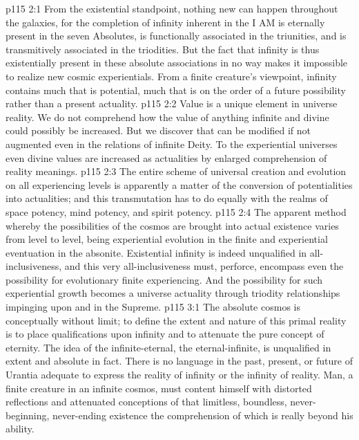 \vs p115 2:1 From the existential standpoint, nothing new can happen throughout the galaxies, for the completion of infinity inherent in the I AM is eternally present in the seven Absolutes, is functionally associated in the triunities, and is transmitively associated in the triodities. But the fact that infinity is thus existentially present in these absolute associations in no way makes it impossible to realize new cosmic experientials. From a finite creature’s viewpoint, infinity contains much that is potential, much that is on the order of a future possibility rather than a present actuality.
\vs p115 2:2 Value is a unique element in universe reality. We do not comprehend how the value of anything infinite and divine could possibly be increased. But we discover that  can be modified if not augmented even in the relations of infinite Deity. To the experiential universes even divine values are increased as actualities by enlarged comprehension of reality meanings.
\vs p115 2:3 The entire scheme of universal creation and evolution on all experiencing levels is apparently a matter of the conversion of potentialities into actualities; and this transmutation has to do equally with the realms of space potency, mind potency, and spirit potency.
\vs p115 2:4 The apparent method whereby the possibilities of the cosmos are brought into actual existence varies from level to level, being experiential evolution in the finite and experiential eventuation in the absonite. Existential infinity is indeed unqualified in all\hyp{}inclusiveness, and this very all\hyp{}inclusiveness must, perforce, encompass even the possibility for evolutionary finite experiencing. And the possibility for such experiential growth becomes a universe actuality through triodity relationships impinging upon and in the Supreme.
\vs p115 3:1 The absolute cosmos is conceptually without limit; to define the extent and nature of this primal reality is to place qualifications upon infinity and to attenuate the pure concept of eternity. The idea of the infinite\hyp{}eternal, the eternal\hyp{}infinite, is unqualified in extent and absolute in fact. There is no language in the past, present, or future of Urantia adequate to express the reality of infinity or the infinity of reality. Man, a finite creature in an infinite cosmos, must content himself with distorted reflections and attenuated conceptions of that limitless, boundless, never\hyp{}beginning, never\hyp{}ending existence the comprehension of which is really beyond his ability.
